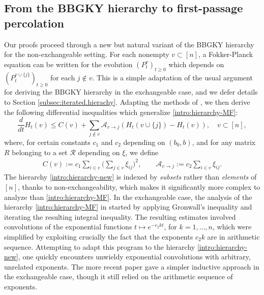 \documentclass[11pt,reqno]{amsart}
\numberwithin{equation}{section}
\theoremstyle{definition}
\def\CC{{C}}
\def\A{{\mathcal A}}
\begin{document}
\subsection{From the BBGKY hierarchy to first-passage percolation} \label{se:intro:FPPbound}

Our proofs proceed through a new but natural variant of the BBGKY hierarchy for the non-exchangeable setting. For each nonempty $v \subset [n]$, a Fokker-Planck equation can be written for the evolution $(P^v_t)_{t \ge 0}$ which depends on $(P^{v \cup \{j\}}_t)_{t \ge 0}$ for each $j \notin v$. This is a simple adaptation of the usual argument for deriving the BBGKY hierarchy in the exchangeable case, and we defer details to Section \ref{subsec:iterated.hierachy}. Adapting the methods of \cite{lacker2022hierarchies}, we then derive the following differential inequalities which generalize \eqref{intro:hierarchy-MF}:
\begin{equation}
\frac{d}{dt}H_t(v) \le \CC(v) +  \sum_{j \notin v} \A_{v \to j}(H_t(v\cup \{j\}) - H_t(v)), \quad v \subset [n], \label{intro:hierarchy-new}
\end{equation}
where, for certain constants $c_1$ and $c_2$ depending on $(b_0,b)$, and for any matrix $R$ belonging to a set $\mathcal{R}$ depending on $\xi$, we define
\begin{align*}
\CC(v) := c_1\sum_{i \in v}\Big(\sum_{j \in v} \xi_{ij}\Big)^2, \qquad \A_{v \to j}:= c_2\sum_{i \in v}\xi_{ij}.
\end{align*}
The hierarchy \eqref{intro:hierarchy-new} is indexed by \emph{subsets} rather than \emph{elements} of $[n]$, thanks to non-exchangeability, which makes it significantly more complex to analyze than \eqref{intro:hierarchy-MF}. In the exchangeable case, the analysis of the hierarchy \eqref{intro:hierarchy-MF} in \cite{lacker2022hierarchies}
started by applying Gronwall's inequality and iterating the resulting integral inequality. The resulting estimates involved convolutions of the exponential functions $t \mapsto e^{-c_2 k t}$, for $k =1,\ldots,n$, which were simplified by exploiting crucially the fact that the exponents $c_2 k$ are in arithmetic sequence.
Attempting to adapt this program to the hierarchy \eqref{intro:hierarchy-new}, one quickly encounters unwieldy exponential convolutions with arbitrary, unrelated exponents. The more recent paper \cite{hess2023higher} gave a simpler inductive approach in the exchangeable case, though it still relied on the arithmetic sequence of exponents.
 
\end{document}
